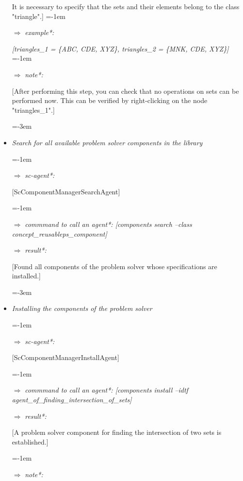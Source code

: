 \documentclass{article}
\begin{document}
\begin{multicols}{2}
\begin{itemize}
It is necessary to specify that the
sets and their elements belong to
the class "triangle".] 
\leftskip=-1em
\item[$\Rightarrow$] \quad
\textit{example*:} \par
\leftskip=0pt
\textit{[triangles\_1 = \{ABC, CDE, XYZ\},
triangles\_2 = \{MNK, CDE,
XYZ\}]} 
\leftskip=-1em
\item[$\Rightarrow$] \quad
\textit{note*:} \par
\leftskip=0pt
[After performing this step, you
can check that no operations on
sets can be performed now. This
can be verified by right-clicking
on the node "triangles\_1".] \par
\leftskip=-3em
 \item\quad\textit{Search for all available problem solver
components in the library} \par
\leftskip=-1em
\item[$\Rightarrow$] \quad
\textit{sc-agent*:} \par
\leftskip=0pt
[ScComponentManagerSearchAgent] \par
\leftskip=-1em
\item[$\Rightarrow$] \quad
\textit{commmand to call an agent*:
[components search  --class concept\_reusable\-ps\_component]} 
\item[$\Rightarrow$] \quad
\textit{result*:} \par
\leftskip=0pt
[Found all components of the problem solver whose specifications
are installed.] \par
\leftskip=-3em
  \item\quad\textit{Installing the components of the problem
  solver} \par
  \leftskip=-1em
\item[$\Rightarrow$] \quad
\textit{sc-agent*:} \par
\leftskip=0pt
[ScComponentManagerInstallAgent] \par
\leftskip=-1em
\item[$\Rightarrow$] \quad
\textit{commmand to call an agent*: 
[components install --idtf
agent\_of\_finding\_intersection\_of\_sets]}
\par
\item[$\Rightarrow$] \quad
\textit{result*:} \par
\leftskip=0pt
[A problem solver component for
finding the intersection of two
sets is established.] \par
\leftskip=-1em
\item[$\Rightarrow$] \quad
\textit{note*:} \par

\end{itemize}
\end{multicols}
\end{document}
